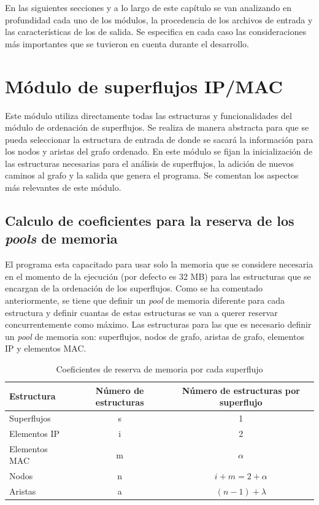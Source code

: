 \documentclass[twoside, 12pt]{epstfg}
\begin{document}
En las siguientes secciones y a lo largo de este capítulo se van analizando en profundidad cada uno de los módulos, la procedencia de los archivos de entrada y las características de los de salida. Se especifica en cada caso las consideraciones más importantes que se tuvieron en cuenta durante el desarrollo.

\section{Módulo de superflujos IP/MAC}
\label{sec:Desarrollo:IPMAC}
Este módulo utiliza directamente todas las estructuras y funcionalidades del módulo de ordenación de superflujos. Se realiza de manera abstracta para que se pueda seleccionar la estructura de entrada de donde se sacará la información para los nodos y aristas del grafo ordenado. En este módulo se fijan la inicialización de las estructuras necesarias para el análisis de superflujos, la adición de nuevos caminos al grafo y la salida que genera el programa. Se comentan los aspectos más relevantes de este módulo.

\subsection{Calculo de coeficientes para la reserva de los \textit{pools} de memoria}
\label{subsec:Desarrollo:IPMAC:CoefPools}
El programa esta capacitado para usar solo la memoria que se considere necesaria en el momento de la ejecución (por defecto es 32 MB) para las estructuras que se encargan de la ordenación de los superflujos. Como se ha comentado anteriormente, se tiene que definir un \textit{pool} de memoria diferente para cada estructura y definir cuantas de estas estructuras se van a querer reservar concurrentemente como máximo. Las estructuras para las que es necesario definir un \textit{pool} de memoria son: superflujos, nodos de grafo, aristas de grafo, elementos IP y elementos MAC.

\begin{table}[hbtp]
	\centering
	\small
	\begin{tabular}{lcc}
		\toprule \textbf{Estructura} & \textbf{Número de estructuras}  & \textbf{Número de estructuras por superflujo} \\ \midrule
		Superflujos & s & 1 \\
		Elementos IP & i & 2 \\
		Elementos MAC & m & $\alpha$ \\
		Nodos & n & $i + m = 2 + \alpha$ \\
		Aristas & a & $(n - 1) + \lambda$  \\ \bottomrule
	\end{tabular}
	\caption{Coeficientes de reserva de memoria por cada superflujo}
	\label{tab:Desarrollo:Coeficientes memoria}
\end{table}
\end{document}
